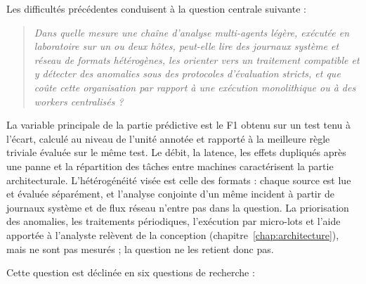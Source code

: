 Les difficultés précédentes conduisent à la question centrale suivante :

\begin{quote}

\textit{Dans quelle mesure une chaîne d'analyse multi-agents légère, exécutée en laboratoire sur un ou deux hôtes, peut-elle lire des journaux système et réseau de formats hétérogènes, les orienter vers un traitement compatible et y détecter des anomalies sous des protocoles d'évaluation stricts, et que coûte cette organisation par rapport à une exécution monolithique ou à des workers centralisés ?}

\end{quote}

La variable principale de la partie prédictive est le F1 obtenu sur un test tenu à l'écart, calculé au niveau de l'unité annotée et rapporté à la meilleure règle triviale évaluée sur le même test. Le débit, la latence, les effets dupliqués après une panne et la répartition des tâches entre machines caractérisent la partie architecturale. L'hétérogénéité visée est celle des formats : chaque source est lue et évaluée séparément, et l'analyse conjointe d'un même incident à partir de journaux système et de flux réseau n'entre pas dans la question. La priorisation des anomalies, les traitements périodiques, l'exécution par micro-lots et l'aide apportée à l'analyste relèvent de la conception (chapitre~\ref{chap:architecture}), mais ne sont pas mesurés ; la question ne les retient donc pas.

Cette question est déclinée en six questions de recherche :

